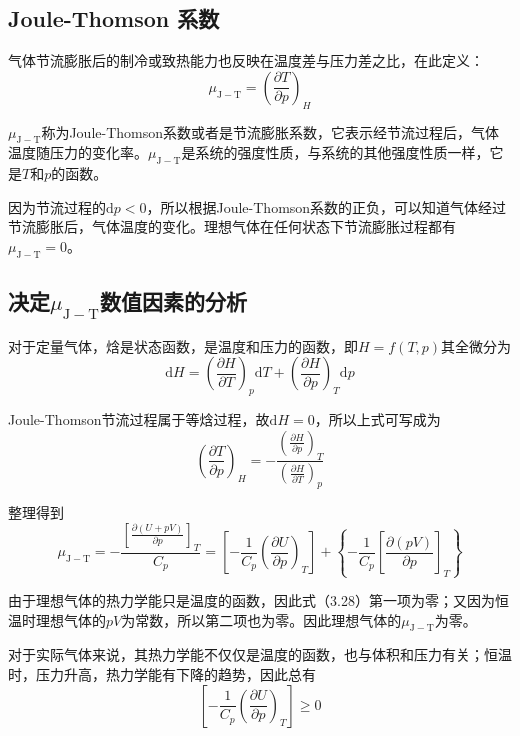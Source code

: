\documentclass[lang=cn,newtx,11pt,scheme=chinese]{elegantbook}
\begin{document}
\subsection{Joule-Thomson 系数}
气体节流膨胀后的制冷或致热能力也反映在温度差与压力差之比，在此定义：
\begin{equation}
	\mu_{\mathrm{J-T}} = \left ( \frac{\partial T}{\partial p}  \right )_H
\end{equation}

$\mu_\mathrm{J-T}$称为Joule-Thomson系数或者是节流膨胀系数，它表示经节流过程后，气体温度随压力的变化率。$\mu_\mathrm{J-T}$是系统的强度性质，与系统的其他强度性质一样，它是$T$和$p$的函数。

因为节流过程的$\mathrm{d}p<0$，所以根据Joule-Thomson系数的正负，可以知道气体经过节流膨胀后，气体温度的变化。理想气体在任何状态下节流膨胀过程都有$\mu_\mathrm{J-T}=0$。

\subsection{决定$\mu_\mathrm{J-T}$数值因素的分析}
对于定量气体，焓是状态函数，是温度和压力的函数，即$H=f(T,p)$其全微分为
$$
\mathrm{d}H=\left ( \frac{\partial H}{\partial T}  \right )_p\mathrm{d}T+\left ( \frac{\partial H}{\partial p}  \right )_T\mathrm{d}p  
$$

Joule-Thomson节流过程属于等焓过程，故$\mathrm{d}H=0$，所以上式可写成为
$$
\left ( \frac{\partial T}{\partial p}  \right )_H=-\frac{\left (\displaystyle  \frac{\partial H}{\partial p}  \right )_T }{\left (\displaystyle  \frac{\partial H}{\partial T}  \right )_p } 
$$

整理得到
\begin{equation}
	\mu_{\mathrm{J-T}} = -\frac{\left [ \displaystyle \frac{\partial (U+pV)}{\partial p}  \right ]_T }{C_p} =\left [ -\frac{1}{C_p}\left ( \frac{\partial U}{\partial p}  \right )_T \right ] +\left \{ -\frac{1}{C_p} \left [ \frac{\partial (pV)}{\partial p}   \right ]_T  \right \} 
\end{equation}

由于理想气体的热力学能只是温度的函数，因此式（3.28）第一项为零；又因为恒温时理想气体的$pV$为常数，所以第二项也为零。因此理想气体的$\mu_{\mathrm{J-T}}$为零。

对于实际气体来说，其热力学能不仅仅是温度的函数，也与体积和压力有关；恒温时，压力升高，热力学能有下降的趋势，因此总有
\begin{equation}
	\left [ -\frac{1}{C_p}\left ( \frac{\partial U}{\partial p}  \right )_T \right ] \geqslant 0
\end{equation}
\end{document}
